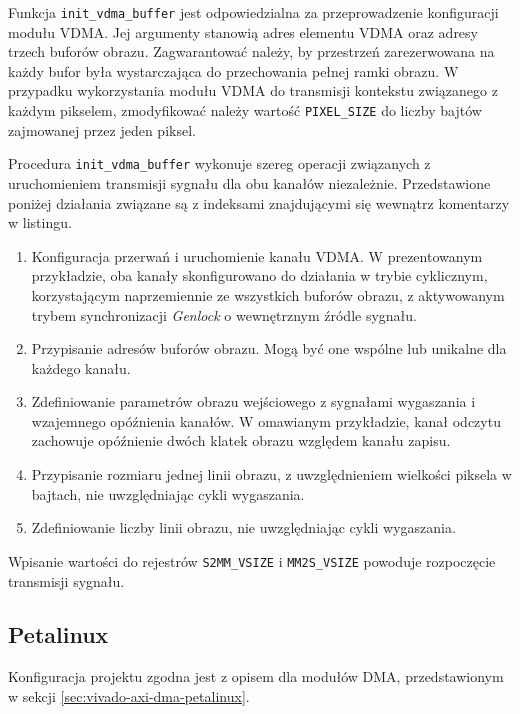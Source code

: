 
Funkcja \texttt{init\_vdma\_buffer} jest odpowiedzialna za przeprowadzenie konfiguracji modułu VDMA. Jej argumenty stanowią adres elementu VDMA oraz adresy trzech buforów obrazu. Zagwarantować należy, by przestrzeń zarezerwowana na każdy bufor była wystarczająca do przechowania pełnej ramki obrazu. W przypadku wykorzystania modułu VDMA do transmisji kontekstu związanego z każdym pikselem, zmodyfikować należy wartość \texttt{PIXEL\_SIZE} do liczby bajtów zajmowanej przez jeden piksel.

Procedura \texttt{init\_vdma\_buffer} wykonuje szereg operacji związanych z uruchomieniem transmisji sygnału dla obu kanałów niezależnie. Przedstawione poniżej działania związane są z indeksami znajdującymi się wewnątrz komentarzy w listingu.
\begin{enumerate}
	\item Konfiguracja przerwań i uruchomienie kanału VDMA.
	W prezentowanym przykładzie, oba kanały skonfigurowano do działania w trybie cyklicznym, korzystającym naprzemiennie ze wszystkich buforów obrazu, z aktywowanym trybem synchronizacji \emph{Genlock} o wewnętrznym źródle sygnału.
	
	\item Przypisanie adresów buforów obrazu. Mogą być one wspólne lub unikalne dla każdego kanału.
	
	\item Zdefiniowanie parametrów obrazu wejściowego z sygnałami wygaszania i wzajemnego opóźnienia kanałów.
	W omawianym przykładzie, kanał odczytu zachowuje opóźnienie dwóch klatek obrazu względem kanału zapisu.
	
	\item Przypisanie rozmiaru jednej linii obrazu, z uwzględnieniem wielkości piksela w bajtach, nie uwzględniając cykli wygaszania.
	
	\item Zdefiniowanie liczby linii obrazu, nie uwzględniając cykli wygaszania.
\end{enumerate}

Wpisanie wartości do rejestrów \texttt{S2MM\_VSIZE} i \texttt{MM2S\_VSIZE} powoduje rozpoczęcie transmisji sygnału.

\subsection{Petalinux}
Konfiguracja projektu zgodna jest z opisem dla modułów DMA, przedstawionym w sekcji \ref{sec:vivado-axi-dma-petalinux}. %

